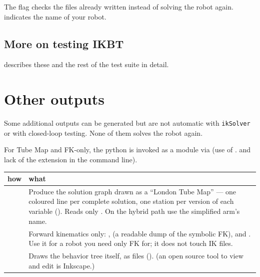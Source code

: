 \documentclass[11pt]{article}
\begin{document}
The flag  checks the files already
written instead of solving the robot again.  indicates the name of
your robot.

\subsection*{More on testing IKBT}
 describes these and the rest of the test suite in
detail.

\section{Other outputs}

Some additional outputs can be generated but are not automatic with
{\tt ikSolver} or with closed-loop testing. None of them solves the robot again.

For Tube Map and FK-only, the python is invoked as a module via  (use of . and lack of the extension 
in the command line).

\begin{center}\small
\begin{tabularx}{\textwidth}{@{}p{}L@{}}
\toprule
how & what \\
\midrule
{}
  & Produce   the solution graph drawn as a ``London Tube Map'' ---
    one coloured line per complete solution, one station per version of each
    variable ().  Reads only .  On
    the hybrid path use the simplified arm's name. \\\hline
{}
  & Forward kinematics only:  ,
     (a readable dump of the symbolic
    FK), and .  Use it for a robot
    you need only FK for;  it does not touch IK files. \\\hline
{}
  & Draws the behavior tree itself, as  files ().
  (an open source tool to view and edit   is Inkscape.)\\
\bottomrule
\end{tabularx}
\end{center}

\end{document}
